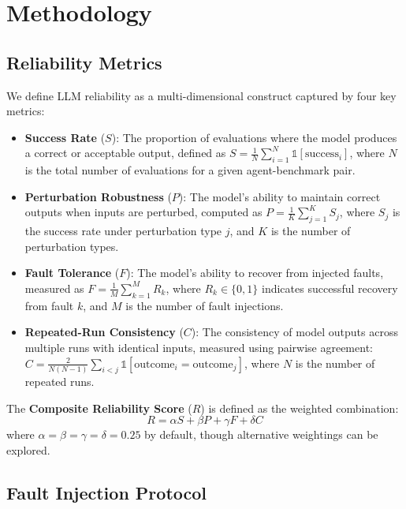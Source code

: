 \section{Methodology}

\subsection{Reliability Metrics}

We define LLM reliability as a multi-dimensional construct captured by four key metrics:

\begin{itemize}
    \item \textbf{Success Rate} ($S$): The proportion of evaluations where the model produces a correct or acceptable output, defined as $S = \frac{1}{N}\sum_{i=1}^{N} \mathbb{1}[\text{success}_i]$, where $N$ is the total number of evaluations for a given agent-benchmark pair.

    \item \textbf{Perturbation Robustness} ($P$): The model's ability to maintain correct outputs when inputs are perturbed, computed as $P = \frac{1}{K}\sum_{j=1}^{K} S_j$, where $S_j$ is the success rate under perturbation type $j$, and $K$ is the number of perturbation types.

    \item \textbf{Fault Tolerance} ($F$): The model's ability to recover from injected faults, measured as $F = \frac{1}{M}\sum_{k=1}^{M} R_k$, where $R_k \in \{0,1\}$ indicates successful recovery from fault $k$, and $M$ is the number of fault injections.

    \item \textbf{Repeated-Run Consistency} ($C$): The consistency of model outputs across multiple runs with identical inputs, measured using pairwise agreement: $C = \frac{2}{N(N-1)}\sum_{i < j} \mathbb{1}[\text{outcome}_i = \text{outcome}_j]$, where $N$ is the number of repeated runs.
\end{itemize}

The \textbf{Composite Reliability Score} ($R$) is defined as the weighted combination:
\[
R = \alpha S + \beta P + \gamma F + \delta C
\]
where $\alpha = \beta = \gamma = \delta = 0.25$ by default, though alternative weightings can be explored.

\subsection{Fault Injection Protocol}

